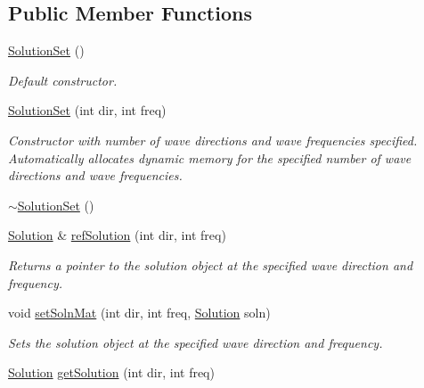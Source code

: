 \subsection*{Public Member Functions}
\begin{DoxyCompactItemize}
\item 
\hypertarget{classosea_1_1ofreq_1_1_solution_set_a0f7bf3b0ffbc11e1eea127614bf668a4}{\hyperlink{classosea_1_1ofreq_1_1_solution_set_a0f7bf3b0ffbc11e1eea127614bf668a4}{Solution\-Set} ()}\label{classosea_1_1ofreq_1_1_solution_set_a0f7bf3b0ffbc11e1eea127614bf668a4}

\begin{DoxyCompactList}\small\item\em Default constructor. \end{DoxyCompactList}\item 
\hyperlink{classosea_1_1ofreq_1_1_solution_set_ac4a508cd109ea0e7726aa47a3c868814}{Solution\-Set} (int dir, int freq)
\begin{DoxyCompactList}\small\item\em Constructor with number of wave directions and wave frequencies specified. Automatically allocates dynamic memory for the specified number of wave directions and wave frequencies. \end{DoxyCompactList}\item 
\hyperlink{classosea_1_1ofreq_1_1_solution_set_af016abf25e2e0ba50336449b12b88423}{$\sim$\-Solution\-Set} ()
\item 
\hyperlink{classosea_1_1ofreq_1_1_solution}{Solution} \& \hyperlink{classosea_1_1ofreq_1_1_solution_set_a5bbd01ec83ef72d924d13d9437407880}{ref\-Solution} (int dir, int freq)
\begin{DoxyCompactList}\small\item\em Returns a pointer to the solution object at the specified wave direction and frequency. \end{DoxyCompactList}\item 
void \hyperlink{classosea_1_1ofreq_1_1_solution_set_abfd970f3f5b875cdc193281c4a5f6f21}{set\-Soln\-Mat} (int dir, int freq, \hyperlink{classosea_1_1ofreq_1_1_solution}{Solution} soln)
\begin{DoxyCompactList}\small\item\em Sets the solution object at the specified wave direction and frequency. \end{DoxyCompactList}\item 
\hyperlink{classosea_1_1ofreq_1_1_solution}{Solution} \hyperlink{classosea_1_1ofreq_1_1_solution_set_aef977b8cf522b4d24cdd08df70d372f0}{get\-Solution} (int dir, int freq)

\end{DoxyCompactItemize}
